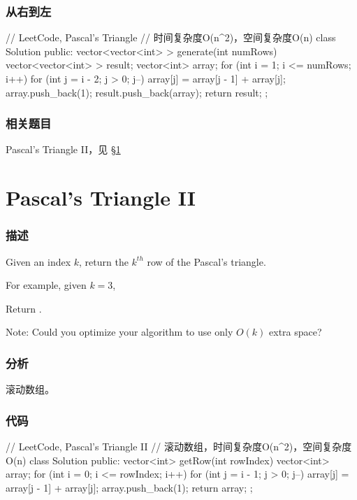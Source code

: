 \subsubsection{从右到左}
\begin{Code}
// LeetCode, Pascal's Triangle
// 时间复杂度O(n^2)，空间复杂度O(n)
class Solution {
public:
    vector<vector<int> > generate(int numRows) {
        vector<vector<int> > result;
        vector<int> array;
        for (int i = 1; i <= numRows; i++) {
            for (int j = i - 2; j > 0; j--) {
                array[j] = array[j - 1] + array[j];
            }
            array.push_back(1);
            result.push_back(array);
        }
        return result;
    }
};
\end{Code}


\subsubsection{相关题目}
\begindot
\item Pascal's Triangle II，见 \S \ref{sec:pascals-triangle-ii}
\myenddot


\section{Pascal's Triangle II} %
\label{sec:pascals-triangle-ii}


\subsubsection{描述}
Given an index $k$, return the $k^{th}$ row of the Pascal's triangle.

For example, given $k = 3$,

Return \code{[1,3,3,1]}.

Note: Could you optimize your algorithm to use only $O(k)$ extra space?


\subsubsection{分析}
滚动数组。


\subsubsection{代码}

\begin{Code}
// LeetCode, Pascal's Triangle II
// 滚动数组，时间复杂度O(n^2)，空间复杂度O(n)
class Solution {
public:
	vector<int> getRow(int rowIndex) {
		vector<int> array;
		for (int i = 0; i <= rowIndex; i++) {
			for (int j = i - 1; j > 0; j--){
				array[j] = array[j - 1] + array[j];
			}
			array.push_back(1);
		}
		return array;
	}
};
\end{Code}


